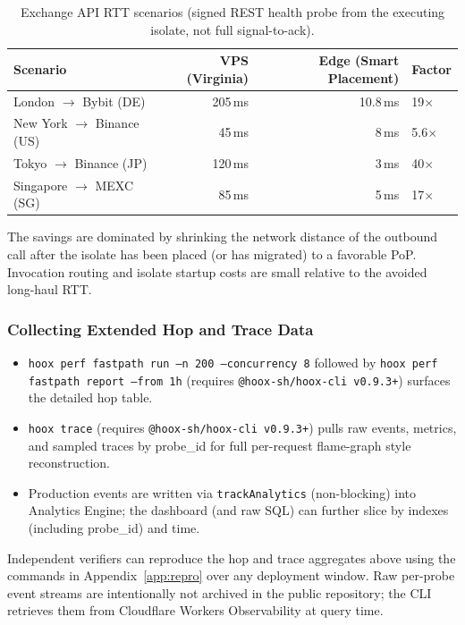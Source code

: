 \begin{table}[t]
  \centering
  \caption{Exchange API RTT scenarios (signed REST health probe from the executing isolate, not full signal-to-ack).}
  \label{tab:scenarios}
  \small
  \begin{tabular*}{\linewidth}{@{\extracolsep{\fill}}lrrl@{}}
    \toprule
    \textbf{Scenario} & \textbf{VPS (Virginia)} & \textbf{Edge (Smart Placement)} & \textbf{Factor} \\
    \midrule
    London $\to$ Bybit (DE) & 205\,ms & 10.8\,ms & 19$\times$ \\
    New York $\to$ Binance (US) & 45\,ms & 8\,ms & 5.6$\times$ \\
    Tokyo $\to$ Binance (JP) & 120\,ms & 3\,ms & 40$\times$ \\
    Singapore $\to$ MEXC (SG) & 85\,ms & 5\,ms & 17$\times$ \\
    \bottomrule
  \end{tabular*}
\end{table}

The savings are dominated by shrinking the network distance of the outbound call after the isolate has been placed (or has migrated) to a favorable PoP. Invocation routing and isolate startup costs are small relative to the avoided long-haul RTT.

\subsubsection{Collecting Extended Hop and Trace Data}

\begin{itemize}
  \item \texttt{hoox perf fastpath run --n 200 --concurrency 8} followed by \texttt{hoox perf fastpath report --from 1h} (requires \texttt{@hoox-sh/hoox-cli v0.9.3+}) surfaces the detailed hop table.
  \item \texttt{hoox trace} (requires \texttt{@hoox-sh/hoox-cli v0.9.3+}) pulls raw events, metrics, and sampled traces by probe\_id for full per-request flame-graph style reconstruction.
  \item Production events are written via \texttt{trackAnalytics} (non-blocking) into Analytics Engine; the dashboard (and raw SQL) can further slice by indexes (including probe\_id) and time.
\end{itemize}

Independent verifiers can reproduce the hop and trace aggregates above using the commands in Appendix~\ref{app:repro} over any deployment window. Raw per-probe event streams are intentionally not archived in the public repository; the CLI retrieves them from Cloudflare Workers Observability at query time.

